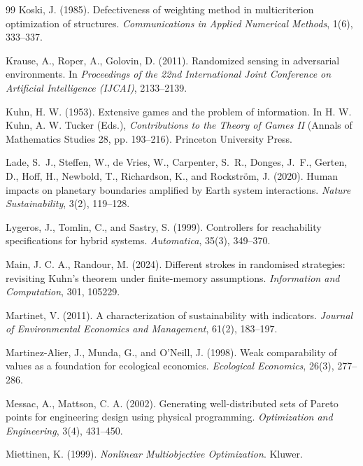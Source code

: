 \begin{thebibliography}{99}
 Koski, J. (1985). Defectiveness of weighting method in multicriterion optimization of structures. \emph{Communications in Applied Numerical Methods}, 1(6), 333--337.

 Krause, A., Roper, A., Golovin, D. (2011). Randomized sensing in adversarial environments. In \emph{Proceedings of the 22nd International Joint Conference on Artificial Intelligence (IJCAI)}, 2133--2139.

 Kuhn, H. W. (1953). Extensive games and the problem of information. In H. W. Kuhn, A. W. Tucker (Eds.), \emph{Contributions to the Theory of Games II} (Annals of Mathematics Studies 28, pp. 193--216). Princeton University Press.

 Lade, S.~J., Steffen, W., de Vries, W., Carpenter, S.~R., Donges, J.~F., Gerten, D., Hoff, H., Newbold, T., Richardson, K., and Rockstr\"om, J. (2020). Human impacts on planetary boundaries amplified by Earth system interactions. \emph{Nature Sustainability}, 3(2), 119--128.

 Lygeros, J., Tomlin, C., and Sastry, S. (1999). Controllers for reachability specifications for hybrid systems. \emph{Automatica}, 35(3), 349--370.

 Main, J. C. A., Randour, M. (2024). Different strokes in randomised strategies: revisiting Kuhn's theorem under finite-memory assumptions. \emph{Information and Computation}, 301, 105229.

 Martinet, V. (2011). A characterization of sustainability with indicators. \emph{Journal of Environmental Economics and Management}, 61(2), 183--197.

 Martinez-Alier, J., Munda, G., and O'Neill, J. (1998). Weak comparability of values as a foundation for ecological economics. \emph{Ecological Economics}, 26(3), 277--286.

 Messac, A., Mattson, C. A. (2002). Generating well-distributed sets of Pareto points for engineering design using physical programming. \emph{Optimization and Engineering}, 3(4), 431--450.

 Miettinen, K. (1999). \emph{Nonlinear Multiobjective Optimization}. Kluwer.


\end{thebibliography}
